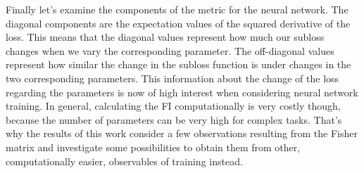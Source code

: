 Finally let's examine the components of the metric for the neural network. The diagonal components are the expectation values of the squared derivative of the loss. This means that the diagonal values represent how much our subloss changes when we vary the corresponding parameter. The off-diagonal values represent how similar the change in the subloss function is under changes in the two corresponding parameters. This information about the change of the loss regarding the parameters is now of high interest when considering neural network training. In general, calculating the FI computationally is very costly though, because the number of parameters can be very high for complex tasks. That's why the results of this work consider a few observations resulting from the Fisher matrix and investigate some possibilities to obtain them from other, computationally easier, observables of training instead.